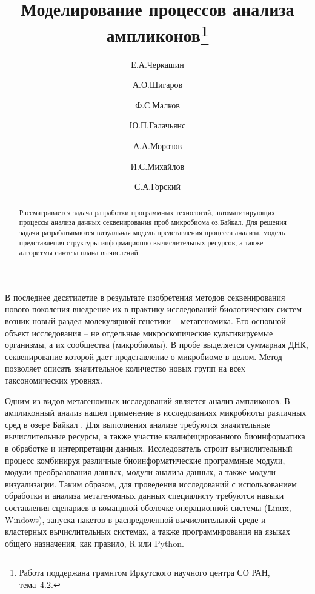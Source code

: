 \documentclass[12pt]{llncs}
\begin{document}
\title{Моделирование процессов анализа ампликонов\thanks{Работа поддержана грамнтом Иркутского научного центра СО РАН, тема\textnumero~4.2.}}

\author{Е.А.Черкашин
  \and
  А.О.Шигаров \and
  Ф.С.Малков \and
  Ю.П.Галачьянс \and
  А.А.Морозов \and
  И.С.Михайлов \and
  С.А.Горский
}


\maketitle

\begin{abstract}
Рассматривается задача разработки программных технологий, автоматизирующих процессы анализа данных секвенирования проб микробиома оз.Байкал.  Для решения задачи разрабатываются визуальная модель представления процесса анализа, модель представления структуры информационно-вычислительных ресурсов, а также алгоритмы синтеза плана вычислений.

\end{abstract}

В последнее десятилетие в результате изобретения методов секвенирования нового поколения внедрение их в практику исследований биологических систем возник новый раздел молекулярной генетики -- метагеномика. Его основной объект исследования -- не отдельные микроскопические культивируемые организмы, а их сообщества (микробиомы).  В пробе выделяется суммарная ДНК, секвенирование которой дает представление  о микробиоме в целом.  Метод позволяет описать значительное количество новых групп на всех таксономических уровнях.

Одним из видов метагеномных исследований является анализ ампликонов. В ампликонный анализ нашёл применение в исследованиях микробиоты различных сред в озере Байкал \cite{underice}.  Для выполнения анализе требуются значительные вычислительные ресурсы, а также участие квалифицированного биоинформатика в обработке и интерпретации данных.  Исследователь строит вычислительный процесс комбинируя различные биоинформатические программные модули, модули преобразования данных, модули анализа данных, а также модули визуализации.  Таким образом, для проведения исследований с использованием обработки и анализа метагеномных данных специалисту требуются навыки составления сценариев в командной оболочке операционной системы (Linux, Windows), запуска пакетов в распределенной вычислительной среде и кластерных вычислительных системах, а также программирования на языках общего назначения, как правило, R или Python.
\end{document}
